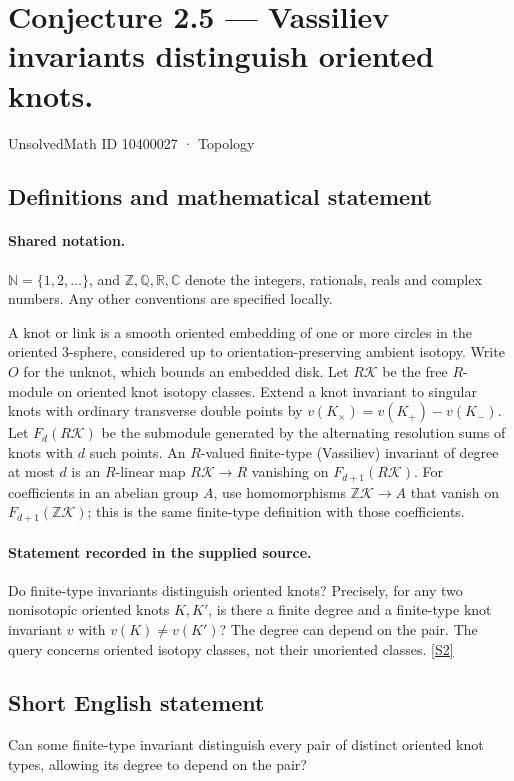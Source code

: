 \documentclass[11pt]{article}
\newcommand{\sref}[2]{\hyperlink{source:#1:#2}{[S#2]}}
\begin{document}
\setcounter{section}{10400026}
\section{Conjecture 2.5 — Vassiliev invariants distinguish oriented knots.}\label{10400027}
{\small\sffamily UnsolvedMath ID 10400027 · Topology}
\subsection{Definitions and mathematical statement}

\paragraph{Shared notation.}$\mathbb N=\{1,2,\ldots\}$, and $\mathbb Z,\mathbb Q,\mathbb R,\mathbb C$ denote the integers, rationals, reals and complex numbers. Any other conventions are specified locally.


A knot or link is a smooth oriented embedding of one or more circles in the oriented $3$-sphere, considered up to orientation-preserving ambient isotopy. Write $O$ for the unknot, which bounds an embedded disk. Let $R\mathcal K$ be the free $R$-module on oriented knot isotopy classes. Extend a knot invariant to singular knots with ordinary transverse double points by $v(K_\times)=v(K_+)-v(K_-)$. Let $F_d(R\mathcal K)$ be the submodule generated by the alternating resolution sums of knots with $d$ such points. An $R$-valued finite-type (Vassiliev) invariant of degree at most $d$ is an $R$-linear map $R\mathcal K\to R$ vanishing on $F_{d+1}(R\mathcal K)$. For coefficients in an abelian group $A$, use homomorphisms $\mathbb Z\mathcal K\to A$ that vanish on $F_{d+1}(\mathbb Z\mathcal K)$; this is the same finite-type definition with those coefficients.
\paragraph{Statement recorded in the supplied source.}
Do finite-type invariants distinguish oriented knots? Precisely, for any two nonisotopic oriented knots $K,K'$, is there a finite degree and a finite-type knot invariant $v$ with $v(K)\ne v(K')$? The degree can depend on the pair. The query concerns oriented isotopy classes, not their unoriented classes. \sref{10400027}{2}
\subsection{Short English statement}
Can some finite-type invariant distinguish every pair of distinct oriented knot types, allowing its degree to depend on the pair?
\end{document}
